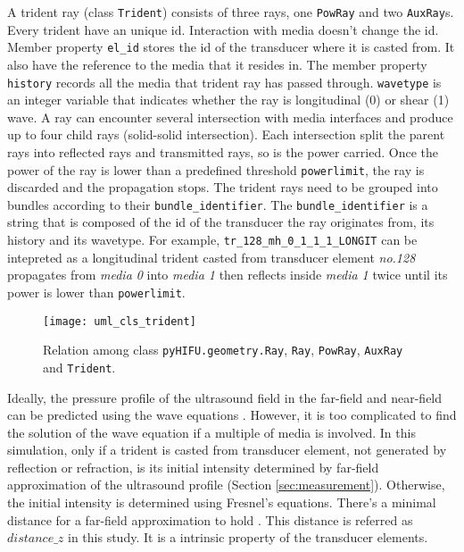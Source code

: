 A trident ray (class \texttt{Trident}) consists of three rays, one \texttt{PowRay} and two \texttt{AuxRay}s. Every trident have an unique id. Interaction with media doesn't change the id. Member property \texttt{el\_id} stores the id of the transducer where it is casted from. It also have the reference to the media that it resides in. The member property \texttt{history} records all the media that trident ray has passed through. \texttt{wavetype} is an integer variable that indicates whether the ray is longitudinal (0) or shear (1) wave. A ray can encounter several intersection with media interfaces and produce up to four child rays (solid-solid intersection). Each intersection split the parent rays into reflected rays and transmitted rays, so is the power carried. Once the power of the ray is lower than a predefined threshold \texttt{powerlimit}, the ray is discarded and the propagation stops.
The trident rays need to be grouped into bundles according to their \texttt{bundle\_identifier}. The \texttt{bundle\_identifier} is a string that is composed of the id of the transducer the ray originates from, its history and its wavetype. For example, \texttt{tr\_128\_mh\_0\_1\_1\_1\_LONGIT} can be intepreted as a longitudinal trident casted from transducer element \textit{no.128} propagates from \textit{media 0} into \textit{media 1} then reflects inside  \textit{media 1} twice until its power is lower than \texttt{powerlimit}.

\begin{figure}[h]
    \centering
    \texttt{[image: uml\_cls\_trident]}
    \caption{Relation among class \texttt{pyHIFU.geometry.Ray}, \texttt{Ray}, \texttt{PowRay}, \texttt{AuxRay}  and  \texttt{Trident}.}
    \label{fig:uml_cls_trident}
\end{figure}

Ideally, the pressure profile of the ultrasound field in the far-field and near-field can be predicted using the wave equations \cite{vanwijk2013}. However, it is too complicated to find the solution of the wave equation if a multiple of media is involved. In this simulation, only if a trident is casted from transducer element, not generated by reflection or refraction, is its initial intensity determined by far-field approximation of the ultrasound profile (Section \ref{sec:measurement}). Otherwise, the initial intensity is determined using Fresnel's equations. There's a minimal distance for a far-field approximation to hold \cite{auld1973acoustic}. This distance is referred as $distance\_z$ in this study. It is a intrinsic property of the transducer elements.

